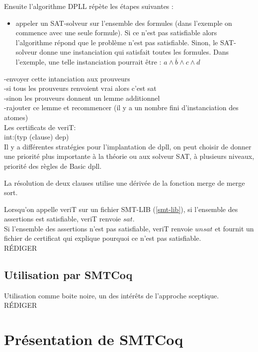 \documentclass[11pt]{article}
\begin{document}
Ensuite l'algorithme DPLL répète les étapes suivantes :
\begin{itemize}
\item appeler un SAT-solveur sur l'ensemble des formules (dans l'exemple on commence avec une seule formule). Si ce n'est pas satisfiable alors l'algorithme répond que le problème n'est pas satisfiable. Sinon, le SAT-solveur donne une instanciation qui satisfait toutes les formules. Dans l'exemple, une telle instanciation pourrait être :
  $a \wedge \overline{b} \wedge c \wedge d$
\end{itemize}
-envoyer cette intanciation aux prouveurs \\
-si tous les prouveurs renvoient vrai alors c'est sat \\
-sinon les prouveurs donnent un lemme additionnel \\
-rajouter ce lemme et recommencer (il y a un nombre fini d'instanciation des atomes)\\ 

Les certificats de veriT:\\
int:(typ (clause) dep)\\


Il y a différentes stratégies pour l'implantation de dpll, on peut choisir de donner une priorité plus importante à la théorie ou aux solveur SAT, à plusieurs niveaux, priorité des règles de Basic dpll. 

La résolution de deux clauses utilise une dérivée de la fonction merge de merge sort.

Lorsqu'on appelle veriT sur un fichier SMT-LIB (\ref{smt-lib}), si l'ensemble des assertions est satisfiable, veriT renvoie $sat$. \\
Si l'ensemble des assertions n'est pas satisfiable, veriT renvoie $unsat$ et fournit un fichier de certificat qui explique pourquoi ce n'est pas satisfiable. \\


RÉDIGER

\subsection{Utilisation par SMTCoq}


Utilisation comme boite noire, un des intérêts de l'approche sceptique.\\

RÉDIGER


\newpage 
\section{Présentation de SMTCoq}
\end{document}
